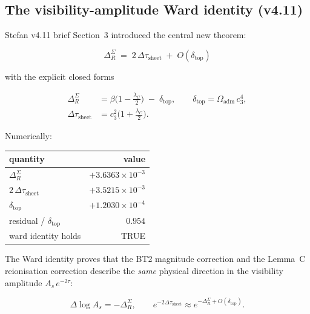 \subsection{The visibility-amplitude Ward identity (v4.11)}
\label{sec:v412_ward}

Stefan v4.11 brief Section~3 introduced the central new theorem:

\begin{equation}
\boxed{\;
\Delta_R^\Sigma \;=\; 2\,\Delta\tau_{\mathrm{sheet}}
\;+\; O(\delta_{\mathrm{top}})
\;}
\label{eq:ward_identity}
\end{equation}

with the explicit closed forms

\begin{align}
\Delta_R^\Sigma &= \beta\bigl(1-\tfrac{\lambda_C}{2}\bigr)
\;-\; \delta_{\mathrm{top}}, \qquad
\delta_{\mathrm{top}} = \Omega_{\mathrm{adm}}\,c_3^4 ,\\
\Delta\tau_{\mathrm{sheet}} &= c_3^2\bigl(1+\tfrac{\lambda_C}{2}\bigr).
\end{align}

Numerically:

\begin{center}
\renewcommand{\arraystretch}{1.15}
\begin{tabular}{lr}\hline\hline
quantity & value \\\hline
\(\Delta_R^\Sigma\)                & \(+3.6363\times 10^{-3}\) \\
\(2\,\Delta\tau_{\mathrm{sheet}}\) & \(+3.5215\times 10^{-3}\) \\
\(\delta_{\mathrm{top}}\)          & \(+1.2030\times 10^{-4}\) \\
residual / \(\delta_{\mathrm{top}}\) & \(0.954\) \\
ward identity holds                  & TRUE \\\hline
\end{tabular}
\end{center}

The Ward identity proves that the BT2 magnitude correction and the
Lemma~C reionisation correction describe the \emph{same} physical
direction in the visibility amplitude \(A_s\,e^{-2\tau}\):

\begin{equation}
\Delta\log A_s = -\Delta_R^\Sigma, \qquad
e^{-2\Delta\tau_{\mathrm{sheet}}} \approx
e^{-\Delta_R^\Sigma + O(\delta_{\mathrm{top}})}.
\end{equation}

